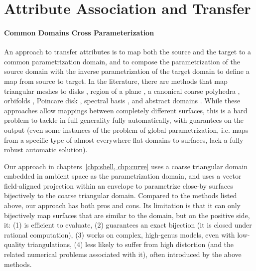 \section{Attribute Association and Transfer}
\paragraph{Common Domains Cross Parameterization}

An approach to transfer attributes is to map both the source and the target to a common parametrization domain, and to compose the parametrization of the source domain with the inverse parametrization of the target domain to define a map from source to target. In the literature, there are methods that map triangular meshes to disks \cite{Tutte:1963,Floater:97}, region of a plane 
\cite{maron2017convolutional,Aigerman:2015b,Aigerman:2014,Schuller:2013,Smith:2015,rabinovich2017scalable,jiang2017simplicial,Weber:2014:LIP,Campen:2016,Muller:2015,Gotsman:2001,surazhsky2001morphing,Zhang:2005,Fu:2016,litke2005image,schmidt2019distortion}, a canonical coarse polyhedra \cite{kraevoy2004cross,praun2001consistent}, orbifolds \cite{Aigerman:2015,Aigerman:2017,Aigerman:2016}, Poincare disk \cite{Springborn:2008,stephenson2005introduction,Kharevych:2006,Jin:2008}, spectral basis \cite{Ovsjanikov:2012,Shoham:2019,Ovsjanikov:2017}, and abstract domains \cite{kraevoy2004cross,Schreiner:2004,Pietroni:2010}.
While these approaches allow mappings between completely different surfaces, this is a hard problem to tackle in full generality fully automatically, with guarantees on the output (even some instances of the problem of global parametrization, i.e. maps from a specific type of almost everywhere flat domains to surfaces, lack a fully robust automatic solution).

%
Our approach in chapters~\ref{chp:shell, chp:curve} uses a coarse triangular domain embedded in ambient space as the parametrization domain, and uses a vector field-aligned projection within an envelope to parametrize close-by surfaces bijectively to the coarse triangular domain. Compared to the methods listed above, our approach has both pros and cons. Its limitation is that it can only bijectively map surfaces that are similar to the domain, but on the positive side, it: (1) is efficient to evaluate, (2)  guarantees an exact bijection (it is closed under rational computation), (3)  works on complex, high-genus models, even with low-quality triangulations, (4) less likely to suffer from high distortion (and the related numerical problems associated with it), often introduced by the above methods.

